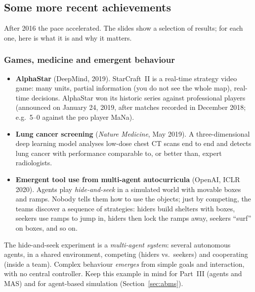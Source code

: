 \subsection{Some more recent achievements}
\label{sec:recent-achievements}

After 2016 the pace accelerated. The slides show a selection of results; for each one,
here is what it is and why it matters.

\subsubsection{Games, medicine and emergent behaviour}

\begin{itemize}
  \item \textbf{AlphaStar} (DeepMind, 2019). StarCraft~II is a real-time strategy video game:
        many units, partial information (you do not see the whole map), real-time decisions.
        AlphaStar won its historic series against professional players (announced on
        January 24, 2019, after matches recorded in December 2018; e.g.\ 5--0 against the pro
        player MaNa).
  \item \textbf{Lung cancer screening} (\emph{Nature Medicine}, May 2019). A
        three-dimensional deep learning model analyses low-dose chest CT scans end to end and
        detects lung cancer with performance comparable to, or better than, expert
        radiologists.
  \item \textbf{Emergent tool use from multi-agent autocurricula} (OpenAI, ICLR 2020). Agents
        play \emph{hide-and-seek} in a simulated world with movable boxes and ramps. Nobody
        tells them how to use the objects; just by competing, the teams discover a sequence
        of strategies: hiders build shelters with boxes, seekers use ramps to jump in,
        hiders then lock the ramps away, seekers ``surf'' on boxes, and so on.
\end{itemize}

\begin{nbwhy}
The hide-and-seek experiment is a \emph{multi-agent system}: several autonomous agents,
in a shared environment, competing (hiders vs.\ seekers) and cooperating (inside a team).
Complex behaviour \emph{emerges} from simple goals and interaction, with no central
controller. Keep this example in mind for Part~III (agents and MAS) and for agent-based
simulation (Section~\ref{sec:abms}).
\end{nbwhy}

